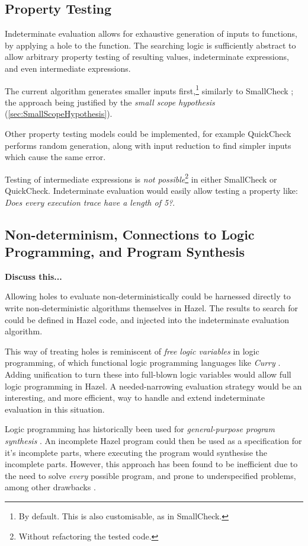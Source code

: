 \subsection{Property Testing}
Indeterminate evaluation allows for exhaustive generation of inputs to functions, by applying a hole to the function. The searching logic is sufficiently abstract to allow arbitrary property testing of resulting values, indeterminate expressions, and even intermediate expressions.

The current algorithm generates smaller inputs first,\footnote{By default. This is also customisable, as in SmallCheck.} similarly to SmallCheck \cite{SmallCheck}; the approach being justified by the \textit{small scope hypothesis} (\cref{sec:SmallScopeHypothesis}). 

Other property testing models could be implemented, for example QuickCheck \cite{QuickCheck} performs random generation, along with input reduction to find simpler inputs which cause the same error.

Testing of intermediate expressions is \textit{not possible}\footnote{Without refactoring the tested code.} in either SmallCheck or QuickCheck. Indeterminate evaluation would easily allow testing a property like: \textit{Does every execution trace have a length of 5?}.

\subsection{Non-determinism, Connections to Logic Programming, and Program Synthesis}
\label{sec:LogicProgramming}
\textbf{Discuss this...}

Allowing holes to evaluate non-deterministically could be harnessed directly to write non-deterministic algorithms themselves in Hazel. The results to search for could be defined in Hazel code, and injected into the indeterminate evaluation algorithm.

This way of treating holes is reminiscent of \textit{free logic variables} in logic programming, of which functional logic programming languages \cite{FunctionalLogicProgramming} like \textit{Curry} \cite{CurryLang}. Adding unification \cite{UnificationSurvey} to turn these into full-blown logic variables would allow full logic programming in Hazel. A needed-narrowing evaluation strategy \cite{NeededNarrowing} would be an interesting, and more efficient, way to handle and extend indeterminate evaluation in this situation.

Logic programming has historically been used for \textit{general-purpose program synthesis} \cite{LogicProgramSynthesis}. An incomplete Hazel program could then be used as a specification for it's incomplete parts, where executing the program would synthesise the incomplete parts. However, this approach has been found to be inefficient due to the need to solve \textit{every} possible program, and prone to underspecified problems, among other drawbacks \cite{LogicProgramSynthesisDrawbacks}. 

